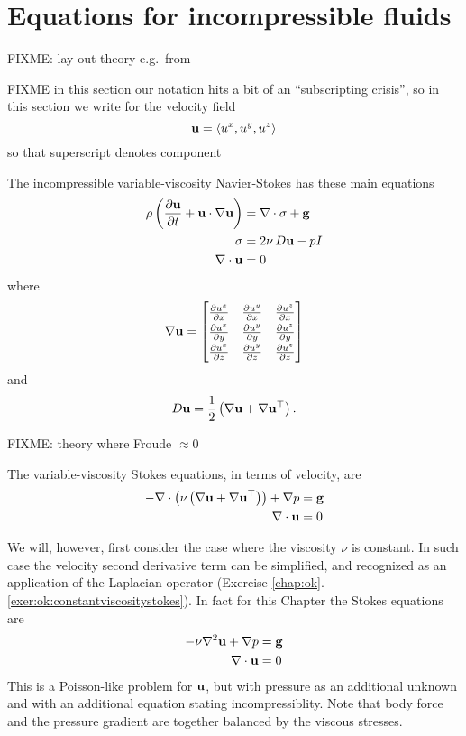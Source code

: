 
\section{Equations for incompressible fluids}

FIXME: lay out theory e.g.~from \citep{Acheson1990,Ockendonetal2003}

FIXME in this section our notation hits a bit of an ``subscripting crisis'', so in this section we write for the velocity field
    $$\mathbf{u} = \left<u^x,u^y,u^z\right>$$
so that superscript denotes component

The incompressible variable-viscosity Navier-Stokes has these main equations
\begin{align}
\rho \left(\frac{\partial \mathbf{u}}{\partial t} + \mathbf{u} \cdot \nabla \mathbf{u}\right) &= \nabla\cdot \sigma + \mathbf{g} \label{eq:ok:stokesgeneralconserve} \\
\sigma &= 2 \nu\, D \mathbf{u} - p I \label{eq:ok:stokesgenerallaw} \\
\nabla\cdot \mathbf{u} &= 0 \label{eq:ok:stokesgeneralincomp}
\end{align}
where
\begin{equation}
\grad \bu = \renewcommand{\arraystretch}{1.3}\begin{bmatrix}
    \frac{\partial u^x}{\partial x} & \frac{\partial u^y}{\partial x} & \frac{\partial u^z}{\partial x} \\
    \frac{\partial u^x}{\partial y} & \frac{\partial u^y}{\partial y} & \frac{\partial u^z}{\partial y} \\
    \frac{\partial u^x}{\partial z} & \frac{\partial u^y}{\partial z} & \frac{\partial u^z}{\partial z}
    \end{bmatrix}  \label{eq:ok:gradudefinition}
\end{equation}
and
    $$D \mathbf{u} = \frac{1}{2} \left(\nabla \mathbf{u} + \nabla \mathbf{u}^{\top}\right).$$

FIXME: theory where Froude $\approx 0$

The variable-viscosity Stokes equations, in terms of velocity, are
\begin{align*}
- \nabla\cdot \left(\nu \left(\nabla \mathbf{u} + \nabla \mathbf{u}^{\top}\right)\right) + \nabla p &= \mathbf{g} \\
\nabla\cdot \mathbf{u} &= 0
\end{align*}

We will, however, first consider the case where the viscosity $\nu$ is constant.  In such case the velocity second derivative term can be simplified, and recognized as an application of the Laplacian operator (Exercise \ref{chap:ok}.\ref{exer:ok:constantviscositystokes}).  In fact for this Chapter the Stokes equations are
\begin{align}
- \nu \nabla^2 \mathbf{u} + \nabla p &= \mathbf{g}  \label{eq:ok:constantviscositystokes} \\
\nabla\cdot \mathbf{u} &= 0  \label{eq:ok:constantviscosityincomp}
\end{align}
This is a Poisson-like problem for $\mathbf{u}$, but with pressure as an additional unknown and with an additional equation stating incompressiblity.  Note that body force and the pressure gradient are together balanced by the viscous stresses. 


